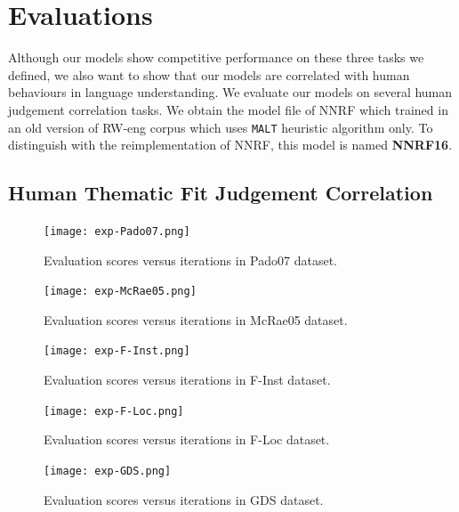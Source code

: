 \documentclass[a4paper]{article}
\begin{document}
\section{Evaluations} \label{sec:evaluation}
Although our models show competitive performance on these three tasks we defined, we also want to show that our models are correlated with human behaviours in language understanding. We evaluate our models on several human judgement correlation tasks. We obtain the model file of NNRF which trained in an old version of RW-eng corpus which uses \texttt{MALT} heuristic algorithm only. To distinguish with the reimplementation of NNRF, this model is named \textbf{NNRF16}. 


\subsection{Human Thematic Fit Judgement Correlation}  \label{sec:thematicfit}


\begin{figure}[p]
\centering
\texttt{[image: exp-Pado07.png]}
\caption{\label{fig:exp-Pado07} Evaluation scores versus iterations in Pado07 dataset. }
\end{figure}

\begin{figure}[p]
\centering
\texttt{[image: exp-McRae05.png]}
\caption{\label{fig:exp-McRae05} Evaluation scores versus iterations in McRae05 dataset. }
\end{figure}

\begin{figure}[p]
\centering
\texttt{[image: exp-F-Inst.png]}
\caption{\label{fig:exp-F-Inst} Evaluation scores versus iterations in F-Inst dataset. }
\end{figure}

\begin{figure}[p]
\centering
\texttt{[image: exp-F-Loc.png]}
\caption{\label{fig:exp-F-Loc} Evaluation scores versus iterations in F-Loc dataset. }
\end{figure}

\begin{figure}[p]
\centering
\texttt{[image: exp-GDS.png]}
\caption{\label{fig:exp-GDS} Evaluation scores versus iterations in GDS dataset. }
\end{figure}
\end{document}
